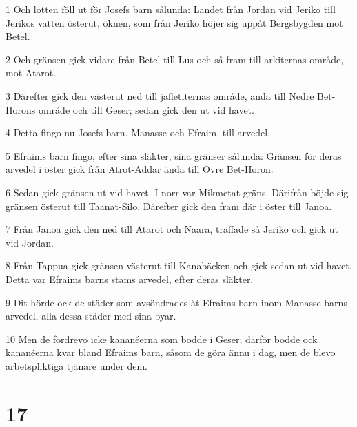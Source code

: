 \par 1 Och lotten föll ut för Josefs barn sålunda: Landet från Jordan vid Jeriko till Jerikos vatten österut, öknen, som från Jeriko höjer sig uppåt Bergsbygden mot Betel.
\par 2 Och gränsen gick vidare från Betel till Lus och så fram till arkiternas område, mot Atarot.
\par 3 Därefter gick den västerut ned till jafletiternas område, ända till Nedre Bet-Horons område och till Geser; sedan gick den ut vid havet.
\par 4 Detta fingo nu Josefs barn, Manasse och Efraim, till arvedel.
\par 5 Efraims barn fingo, efter sina släkter, sina gränser sålunda: Gränsen för deras arvedel i öster gick från Atrot-Addar ända till Övre Bet-Horon.
\par 6 Sedan gick gränsen ut vid havet. I norr var Mikmetat gräns. Därifrån böjde sig gränsen österut till Taanat-Silo. Därefter gick den fram där i öster till Janoa.
\par 7 Från Janoa gick den ned till Atarot och Naara, träffade så Jeriko och gick ut vid Jordan.
\par 8 Från Tappua gick gränsen västerut till Kanabäcken och gick sedan ut vid havet. Detta var Efraims barns stams arvedel, efter deras släkter.
\par 9 Dit hörde ock de städer som avsöndrades åt Efraims barn inom Manasse barns arvedel, alla dessa städer med sina byar.
\par 10 Men de fördrevo icke kananéerna som bodde i Geser; därför bodde ock kananéerna kvar bland Efraims barn, såsom de göra ännu i dag, men de blevo arbetspliktiga tjänare under dem.

\chapter{17}

